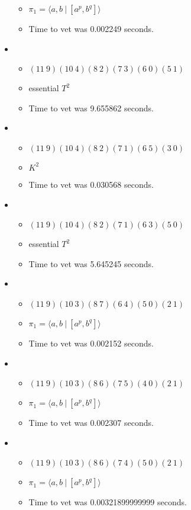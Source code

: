 \documentclass{article}
\begin{document}
\begin{itemize}
\begin{itemize}
      \item $\pi_1 = \langle a,b\ |\ [a^p,b^q]\rangle$
      \item Time to vet was 0.002249 seconds.
\end{itemize}
\item \begin{itemize}
      \item $(11\ 9)(10\ 4)(8\ 2)(7\ 3)(6\ 0)(5\ 1)$
      \item essential $T^2$
      \item Time to vet was 9.655862 seconds.
\end{itemize}
\item \begin{itemize}
      \item $(11\ 9)(10\ 4)(8\ 2)(7\ 1)(6\ 5)(3\ 0)$
      \item $K^2$
      \item Time to vet was 0.030568 seconds.
\end{itemize}
\item \begin{itemize}
      \item $(11\ 9)(10\ 4)(8\ 2)(7\ 1)(6\ 3)(5\ 0)$
      \item essential $T^2$
      \item Time to vet was 5.645245 seconds.
\end{itemize}
\item \begin{itemize}
      \item $(11\ 9)(10\ 3)(8\ 7)(6\ 4)(5\ 0)(2\ 1)$
      \item $\pi_1 = \langle a,b\ |\ [a^p,b^q]\rangle$
      \item Time to vet was 0.002152 seconds.
\end{itemize}
\item \begin{itemize}
      \item $(11\ 9)(10\ 3)(8\ 6)(7\ 5)(4\ 0)(2\ 1)$
      \item $\pi_1 = \langle a,b\ |\ [a^p,b^q]\rangle$
      \item Time to vet was 0.002307 seconds.
\end{itemize}
\item \begin{itemize}
      \item $(11\ 9)(10\ 3)(8\ 6)(7\ 4)(5\ 0)(2\ 1)$
      \item $\pi_1 = \langle a,b\ |\ [a^p,b^q]\rangle$
      \item Time to vet was 0.00321899999999 seconds.

\end{itemize}
\end{itemize}
\end{document}
